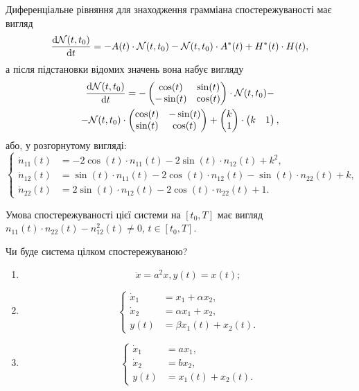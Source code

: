 \begin{solution}
	Диференціальне рівняння для знаходження грамміана спостережуваності має вигляд \[ \frac{\mathop{}\!\mathrm{d} \mathcal{N}(t, t_0)}{\mathop{}\!\mathrm{d} t} = -A(t) \cdot \mathcal{N}(t, t_0) - \mathcal{N}(t, t_0) \cdot A^*(t) + H^*(t) \cdot H(t), \] а після підстановки відомих значень вона набує вигляду \begin{multline*} 
		\frac{\mathop{}\!\mathrm{d} \mathcal{N}(t, t_0)}{\mathop{}\!\mathrm{d} t} = -\begin{pmatrix} \cos (t) & \sin(t) \\ - \sin(t) & \cos(t) \end{pmatrix} \cdot \mathcal{N}(t, t_0) - \\
		- \mathcal{N}(t, t_0) \cdot \begin{pmatrix} \cos (t) & -\sin(t) \\ \sin(t) & \cos(t) \end{pmatrix} + \begin{pmatrix} k \\ 1 \end{pmatrix} \cdot \begin{pmatrix} k & 1 \end{pmatrix}, 
	\end{multline*} або, у розгорнутому вигляді: \[
	\left\{
		\begin{aligned}
			\dot n_{11} (t) &= - 2 \cos(t) \cdot n_{11} (t) - 2 \sin(t) \cdot n_{12} (t) + k^2, \\
			\dot n_{12} (t) &= \sin (t) \cdot n_{11} (t) - 2\cos(t) \cdot n_{12} (t) - \sin (t) \cdot n_{22} (t) + k, \\
			\dot n_{22} (t) &= 2 \sin(t) \cdot n_{12} (t) - 2 \cos(t) \cdot n_{22} (t) + 1.
		\end{aligned}
	\right.
	\]

	Умова спостережуваності цієї системи на $[t_0, T]$ має вигляд  $n_{11} (t) \cdot n_{22} (t) - n_{12}^2 (t) \ne 0$, $t \in [t_0, T]$.
\end{solution}

\begin{problem}
    Чи буде система цілком спостережуваною?

    \begin{enumerate}
    	\item \[ \ddot x = a^2 x, y(t) = x(t); \]

    	\item \[ \left \{ \begin{aligned}
    		\dot x_1 &= x_1 + \alpha x_2, \\
    		\dot x_2 &= \alpha x_1 + x_2, \\
    		y(t) &= \beta x_1 (t) + x_2 (t).
    	\end{aligned} \right. \]

    	\item \[ \left \{ \begin{aligned}
    		\dot x_1 &= a x_1, \\
    		\dot x_2 &= b x_2, \\
    		y(t) &= x_1 (t) + x_2 (t).
    	\end{aligned} \right. \]
    \end{enumerate}
\end{problem}


